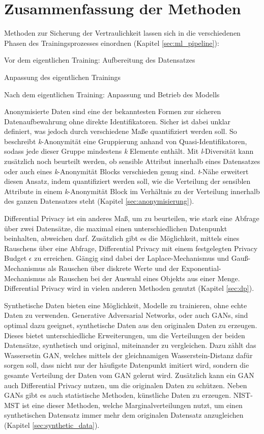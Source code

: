 \section{Zusammenfassung der Methoden}

Methoden zur Sicherung der Vertraulichkeit lassen sich in die verschiedenen Phasen des Trainingsprozesses einordnen (Kapitel \ref{sec:ml_pipeline}):
\begin{compactitem}
\item Vor dem eigentlichen Training: Aufbereitung des Datensatzes
\item Anpassung des eigentlichen Trainings
\item Nach dem eigentlichen Training: Anpassung und Betrieb des Modells
\end{compactitem}

Anonymisierte Daten sind eine der bekanntesten Formen zur sicheren Datenaufbewahrung ohne direkte Identifikatoren.
Sicher ist dabei unklar definiert, was jedoch durch verschiedene Maße quantifiziert werden soll.
So beschreibt \textit{k}-Anonymität eine Gruppierung anhand von Quasi-Identifikatoren, sodass jede dieser Gruppe mindestens \textit{k} Elemente enthält.
Mit \textit{l}-Diversität kann zusätzlich noch beurteilt werden, ob sensible Attribut innerhalb eines Datensatzes oder auch eines \textit{k}-Anonymität Blocks verschieden genug sind.
\textit{t}-Nähe erweitert diesen Ansatz, indem quantifiziert werden soll, wie die Verteilung der sensiblen Attribute in einem \textit{k}-Anonymität Block im Verhältnis zu der Verteilung innerhalb des ganzen Datensatzes steht (Kapitel \ref{sec:anonymisierung}).

Differential Privacy ist ein anderes Maß, um zu beurteilen, wie stark eine Abfrage über zwei Datensätze, die maximal einen unterschiedlichen Datenpunkt beinhalten, abweichen darf.
Zusätzlich gibt es die Möglichkeit, mittels eines Rauschens über eine Abfrage, Differential Privacy mit einem festgelegten Privacy Budget $\epsilon$ zu erreichen.
Gängig sind dabei der Laplace-Mechanismus und Gauß-Mechanismus als Rauschen über diskrete Werte und der Exponential-Mechanismus als Rauschen bei der Auswahl eines Objekts aus einer Menge.
Differential Privacy wird in vielen anderen Methoden genutzt (Kapitel \ref{sec:dp}).

Synthetische Daten bieten eine Möglichkeit, Modelle zu trainieren, ohne echte Daten zu verwenden.
Generative Adversarial Networks, oder auch GANs, sind optimal dazu geeignet, synthetische Daten aus den originalen Daten zu erzeugen.
Dieses bietet unterschiedliche Erweiterungen, um die Verteilungen der beiden Datensätze, synthetisch und original, miteinander zu vergleichen.
Dazu zählt das Wassersetin GAN, welches mittels der gleichnamigen Wasserstein-Distanz dafür sorgen soll, dass nicht nur der häufigste Datenpunkt imitiert wird, sondern die gesamte Verteilung der Daten vom GAN gelernt wird.
Zusätzlich kann ein GAN auch Differential Privacy nutzen, um die originalen Daten zu schützen.
Neben GANs gibt es auch statistische Methoden, künstliche Daten zu erzeugen.
NIST-MST ist eine dieser Methoden, welche Marginalverteilungen nutzt, um einen synthetischen Datensatz immer mehr dem originalen Datensatz anzugleichen (Kapitel \ref{sec:synthetic_data}).

